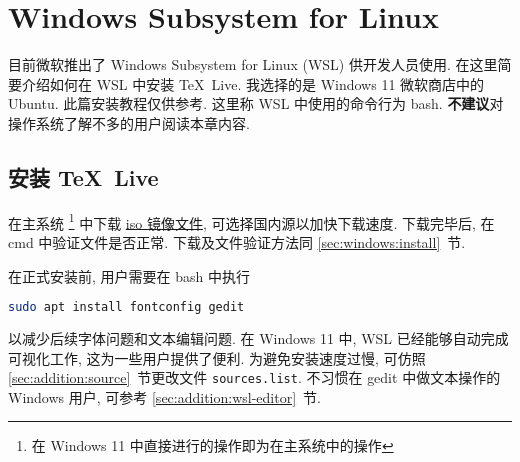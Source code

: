 
\chapter{Windows Subsystem for Linux}

目前微软推出了 Windows Subsystem for Linux (WSL) 供开发人员使用.
在这里简要介绍如何在 WSL 中安装 \TeX\ Live.
我选择的是 Windows 11 微软商店中的 Ubuntu.
此篇安装教程仅供参考.
这里称 WSL 中使用的命令行为 \textsf{bash}.
\textbf{不建议}对操作系统了解不多的用户阅读本章内容.

\section{安装 \TeX\ Live}

在主系统%
\footnote{在 Windows 11 中直接进行的操作即为在主系统中的操作}%
中下载
\href{https://mirrors.ctan.org/systems/texlive/Images/texlive2025.iso}{iso 镜像文件},
可选择国内源以加快下载速度.
下载完毕后, 在 \textsf{cmd} 中验证文件是否正常.
下载及文件验证方法同 \ref{sec:windows:install}~节.

在正式安装前,
用户需要在 \textsf{bash} 中执行
\begin{lstlisting}[language=bash]
  sudo apt install fontconfig gedit
\end{lstlisting}
以减少后续字体问题和文本编辑问题.
在 Windows 11 中,
WSL 已经能够自动完成可视化工作,
这为一些用户提供了便利.
为避免安装速度过慢,
可仿照 \ref{sec:addition:source}~节更改文件 \texttt{sources.list}.
不习惯在 \textsf{gedit} 中做文本操作的 Windows 用户,
可参考 \ref{sec:addition:wsl-editor}~节.

